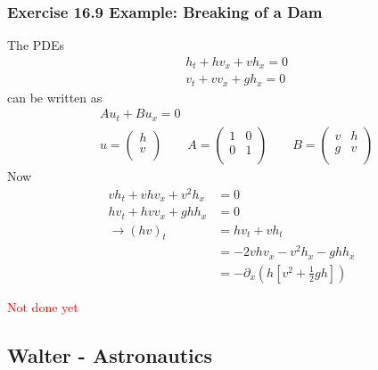 \documentclass[10pt,a4paper]{article}
\theoremstyle{definition}
\begin{document}
\subsubsection{Exercise 16.9 Example: Breaking of a Dam}
The PDEs
\begin{align}
    &h_t+hv_x+vh_x=0\\
    &v_t+vv_x+gh_x=0
\end{align}
can be written as
\begin{align}
&Au_t+Bu_x=0\\
&u=\left(
\begin{array}{c}
 h \\
 v \\
\end{array}
\right)\qquad
A=\left(
\begin{array}{cc}
 1 & 0 \\
 0 & 1 \\
\end{array}
\right)
\qquad
B=\left(
\begin{array}{cc}
 v & h  \\
 g & v  \\
\end{array}
\right)
\end{align}
Now
\begin{align}
    vh_t+vhv_x+v^2h_x&=0\\
    hv_t+hvv_x+ghh_x&=0\\
    \rightarrow (hv)_t&=hv_t+vh_t\\
    &=-2vhv_x-v^2h_x-ghh_x\\
    &=-\partial_x\left(h\left[v^2+\frac{1}{2}gh\right]\right)
\end{align}

\textcolor{red}{Not done yet}

\subsection{{\sc Walter} - Astronautics}
\end{document}

